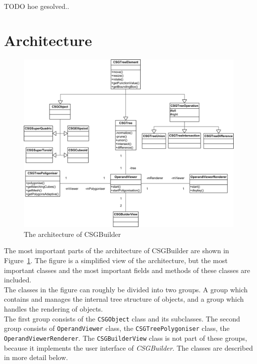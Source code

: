 \documentclass[a4paper,10pt,twocolumn]{article}
\begin{document}
TODO hoe gesolved..

\section{Architecture}
\begin{figure}[!t]
    \includegraphics[width=\textwidth]{./images/architecture}
    \caption{The architecture of CSGBuilder}
    \label{figure:architecture}
\end{figure}

The most important parts of the architecture of CSGBuilder are shown in Figure~\ref{figure:architecture}. The figure is a simplified view of the architecture, but the most important classes and the most important fields and methods of these classes are included.\\

The classes in the figure can roughly be divided into two groups. A group which contains and manages the internal tree structure of objects, and a group which handles the rendering of objects.\\

The first group consists of the \texttt{CSGObject} class and its subclasses. The second group consists of \texttt{OperandViewer} class, the \texttt{CSGTreePolygoniser} class, the \texttt{OperandViewerRenderer}. The \texttt{CSGBuilderView} class is not part of these groups, because it implements the user interface of \textit{CSGBuilder}. The classes are described in more detail below.
\end{document}
